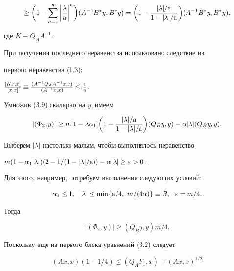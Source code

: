 \begin{pf}
\begin{multline*}
% 


\ge\bigg(1-\sum^\infty_{n=1}\bigg|\frac{\lambda}{\A}\bigg|^n\bigg) 


(A^{-1}B^*y,B^*y)=\bigg(1-\frac{|\lambda|/\A}{1-|\lambda|/\A}\bigg) 


(A^{-1}B^*y,B^*y), 


\end{multline*} 


где $K\equiv Q_A A^{-1}$. 


При получении последнего неравенства использовано следствие из


первого неравенства (1.3): 


$\frac{[K x,x]}{[x,x]}\equiv \frac{(A^{-1}Q_A A^{-1}x,x)} 


{(A^{-1}x,x)}\le\frac{1}{\A}$. 


Умножив (3.9) скалярно на $y$, имеем 


$$ 


|(\Phi_2,y)|\ge m|1-\lambda \alpha_1|\bigg(1- 


\frac{|\lambda|/\A}{1-|\lambda|/\A}\bigg) 


(Q_B y,y)-\alpha|\lambda|(Q_B y,y). 


$$ 


Выберем $|\lambda|$ настолько малым, чтобы выполнялось неравенство 


$m(1-\alpha_1|\lambda|)(2-1/(1-|\lambda|/\A))- 


\alpha|\lambda|\ge\varepsilon>0$. 


Для этого, например, потребуем выполнения следующих условий: 


\begin{equation} 


\alpha_1\le 1,\ \ |\lambda|\le\min\{\A/4,\ m/(4\alpha)\}\equiv R, 


\ \ \varepsilon=m/4. 


\end{equation} 


Тогда 


\begin{equation} 


|(\Phi_2,y)|\ge(Q_B y,y)m/4. 


\end{equation} 


Поскольку еще из первого блока уравнений (3.2) следует 


\begin{equation} 


(Ax,x)(1-1/4)\le(Q_A F_1,x)+(Ax,x)^{1/2} 



\end{equation}
\end{pf}
